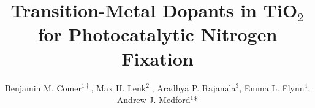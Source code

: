 



\makeatletter
\makeatother

\makeatletter
\makeatother
\title{Transition-Metal Dopants in TiO$_2$ for Photocatalytic Nitrogen Fixation}


\author{Benjamin M. Comer$^{1 \dagger}$, Max H. Lenk$^{2}^{\dagger}$, Aradhya P. Rajanala$^{3}$, Emma L. Flynn$^{4}$, Andrew J. Medford$^{1}$*}


